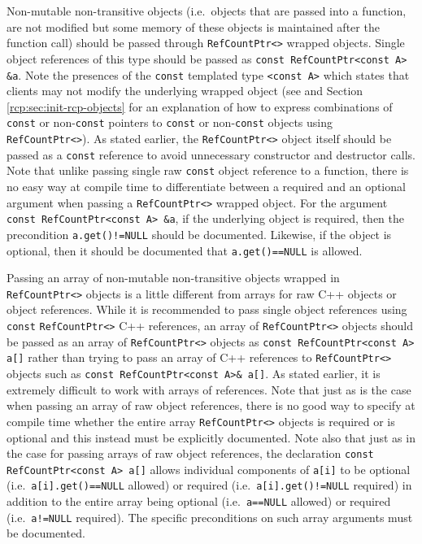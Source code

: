 Non-mutable non-transitive objects (i.e.~objects that are passed into
a function, are not modified but some memory of these objects is
maintained after the function call) should be passed through
{}\texttt{Ref\-Count\-Ptr<>} wrapped objects.  Single object
references of this type should be passed as {}\texttt{const
Ref\-Count\-Ptr<const A> \&a}.  Note the presences of the
{}\texttt{const} templated type {}\texttt{<const A>} which states that
clients may not modify the underlying wrapped object (see
{}\cite[Appendix B]{ref:RefCountPtrBeginnersGuide} and Section
{}\ref{rcp:sec:init-rcp-objects} for an explanation of how to express
combinations of {}\texttt{const} or non-{}\texttt{const} pointers to
{}\texttt{const} or non-{}\texttt{const} objects using
{}\texttt{Ref\-Count\-Ptr<>}).  As stated earlier, the
{}\texttt{Ref\-Count\-Ptr<>} object itself should be passed as a
{}\texttt{const} reference to avoid unnecessary constructor and
destructor calls.  Note that unlike passing single raw
{}\texttt{const} object reference to a function, there is no easy way
at compile time to differentiate between a required and an optional
argument when passing a {}\texttt{Ref\-Count\-Ptr<>} wrapped object.
For the argument {}\texttt{const Ref\-Count\-Ptr<const A> \&a}, if the
underlying object is required, then the precondition
{}\texttt{a.get()!=NULL} should be documented.  Likewise, if the
object is optional, then it should be documented that
{}\texttt{a.get()==NULL} is allowed.

Passing an array of non-mutable non-transitive objects wrapped in
{}\texttt{Ref\-Count\-Ptr<>} objects is a little different from arrays
for raw C++ objects or object references.  While it is recommended to
pass single object references using {}\texttt{const}
{}\texttt{Ref\-Count\-Ptr<>} C++ references, an array of
{}\texttt{Ref\-Count\-Ptr<>} objects should be passed as an array of
{}\texttt{Ref\-Count\-Ptr<>} objects as {}\texttt{const
Ref\-Count\-Ptr<const A> a[]} rather than trying to pass an array of
C++ references to {}\texttt{Ref\-Count\-Ptr<>} objects such as
{}\texttt{const Ref\-Count\-Ptr<const A>\& a[]}.  As stated earlier,
it is extremely difficult to work with arrays of references.  Note
that just as is the case when passing an array of raw object
references, there is no good way to specify at compile time whether
the entire array {}\texttt{Ref\-Count\-Ptr<>} objects is required or
is optional and this instead must be explicitly documented.  Note also
that just as in the case for passing arrays of raw object references,
the declaration {}\texttt{const Ref\-Count\-Ptr<const A> a[]} allows
individual components of {}\texttt{a[i]} to be optional
(i.e.~{}\texttt{a[i].get()==NULL} allowed) or required
(i.e.~{}\texttt{a[i].get()!=NULL} required) in addition to the entire
array being optional (i.e.~{}\texttt{a==NULL} allowed) or required
(i.e.~{}\texttt{a!=NULL} required).  The specific preconditions on
such array arguments must be documented.

